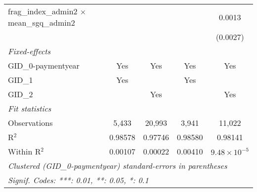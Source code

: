 \begin{tabular}{lcccc}
   frag\_index\_admin2 $\times$ mean\_sgq\_admin2      &               &          &                        & 0.0013\\   
                                                       &               &          &                        & (0.0027)\\   
   \midrule
   \emph{Fixed-effects}\\
   GID\_0-paymentyear                                  & Yes           & Yes      & Yes                    & Yes\\  
   GID\_1                                              & Yes           &          & Yes                    & \\  
   GID\_2                                              &               & Yes      &                        & Yes\\  
   \midrule
   \emph{Fit statistics}\\
   Observations                                        & 5,433         & 20,993   & 3,941                  & 11,022\\  
   R$^2$                                               & 0.98578       & 0.97746  & 0.98580                & 0.98141\\  
   Within R$^2$                                        & 0.00107       & 0.00022  & 0.00410                & $9.48\times 10^{-5}$\\   
   \midrule \midrule
   \multicolumn{5}{l}{\emph{Clustered (GID\_0-paymentyear) standard-errors in parentheses}}\\
   \multicolumn{5}{l}{\emph{Signif. Codes: ***: 0.01, **: 0.05, *: 0.1}}\\
\end{tabular}
\par\endgroup


